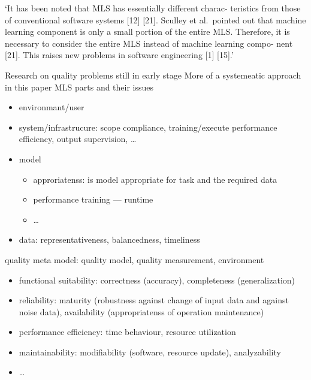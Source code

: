`It has been noted that MLS has essentially different charac- teristics from those of conventional
software systems [12] [21]. Sculley et al.\ pointed out that machine learning component is only a
small portion of the entire \ac{MLS}. Therefore, it is necessary to consider the entire MLS instead
of machine learning compo- nent [21]. This raises new problems in software engineering [1] [15].'

Research on quality problems still in early stage
More of a systemeatic approach in this paper
MLS parts and their issues
\begin{itemize}
    \item environmant/user
    \item system/infrastrucure: scope compliance, training/execute performance efficiency, output
        supervision, \ldots
    \item model
        \begin{itemize}
            \item approriatenss: is model appropriate for task and the required data
            \item performance training --- runtime
            \item \ldots
        \end{itemize}
    \item data: representativeness, balancedness, timeliness
\end{itemize}
quality meta model: quality model, quality measurement, environment
\begin{itemize}
    \item functional suitability: correctness (accuracy), completeness (generalization)
    \item reliability: maturity (robustness against change of input data and against noise data),
        availability (appropriatenss of operation maintenance)
    \item performance efficiency: time behaviour, resource utilization
    \item maintainability: modifiability (software, resource update), analyzability
    \item \ldots
\end{itemize}

